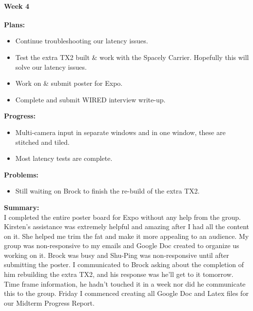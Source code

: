 \paragraph{Week 4}
\begin{adjustwidth}{2.5em}{0pt}
    \vspace{-0.5cm}\textbf{Plans:}
    \vspace{-0.5cm}
    \begin{itemize}
        \item Continue troubleshooting our latency issues.
		\item Test the extra TX2 built \& work with the Spacely Carrier. Hopefully this will solve our latency issues. 
		\item Work on \& submit poster for Expo.
		\item Complete and submit WIRED interview write-up. 
    \end{itemize} 
    \vspace{-0.3cm}\textbf{Progress:}
    \vspace{-0.5cm}
    \begin{itemize}
        \item Multi-camera input in separate windows and in one window, these are stitched and tiled. 
		\item Most latency tests are complete.  
    \end{itemize} 
    \vspace{-0.3cm}\textbf{Problems:}
    \vspace{-0.5cm}
    \begin{itemize}
        \item Still waiting on Brock to finish the re-build of the extra TX2.  
    \end{itemize}  
    \vspace{-0.3cm}\noindent\textbf{Summary:}\\
    \noindent I completed the entire poster board for Expo without any help from the group. Kirsten's assistance was extremely helpful and amazing after I had all the content on it. She helped me trim the fat and make it more appealing to an audience. My group was non-responsive to my emails and Google Doc created to organize us working on it. Brock was busy and Shu-Ping was non-responsive until after submitting the poster. I communicated to Brock asking about the completion of him rebuilding the extra TX2, and his response was he'll get to it tomorrow. Time frame information, he hadn't touched it in a week nor did he communicate this to the group. Friday I commenced creating all Google Doc and Latex files for our Midterm Progress Report. 
\end{adjustwidth} 

